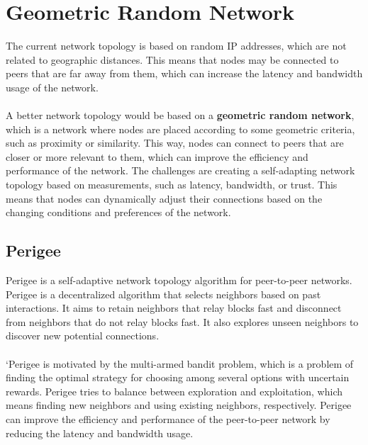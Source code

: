 \section{Geometric Random Network}
The current network topology is based on random IP addresses, which are not related to geographic distances. This means that nodes may be connected to peers that are far away from them, which can increase the latency and bandwidth usage of the network. \\\\
A better network topology would be based on a \textbf{geometric random network}, which is a network where nodes are placed according to some geometric criteria, such as proximity or similarity. This way, nodes can connect to peers that are closer or more relevant to them, which can improve the efficiency and performance of the network. The challenges are creating a self-adapting network topology based on measurements, such as latency, bandwidth, or trust. This means that nodes can dynamically adjust their connections based on the changing conditions and preferences of the network.

\subsection{Perigee}
Perigee is a self-adaptive network topology algorithm for peer-to-peer networks. Perigee is a decentralized algorithm that selects neighbors based on past interactions. It aims to retain neighbors that relay blocks fast and disconnect from neighbors that do not relay blocks fast. It also explores unseen neighbors to discover new potential connections.\\\\
`Perigee is motivated by the multi-armed bandit problem, which is a problem of finding the optimal strategy for choosing among several options with uncertain rewards. Perigee tries to balance between exploration and exploitation, which means finding new neighbors and using existing neighbors, respectively. Perigee can improve the efficiency and performance of the peer-to-peer network by reducing the latency and bandwidth usage.

